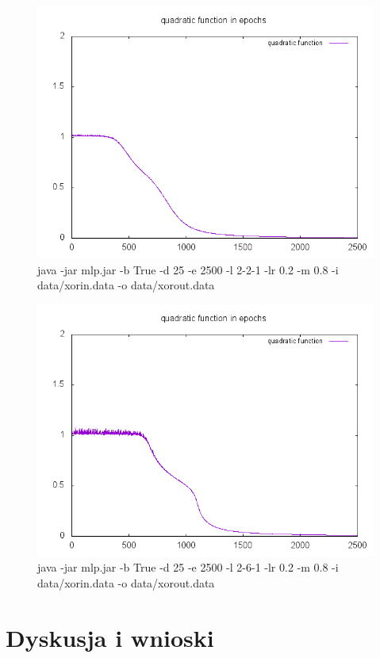 \documentclass{classrep}
\begin{document}
{\newpage
\begin{figure}[h!]
 \centering
 \includegraphics[width=12cm]{img/xor221biastrue.png}
 \vspace{-0.3cm}
 \caption{java -jar mlp.jar -b True -d 25 -e 2500 -l 2-2-1 -lr 0.2 -m 0.8 -i data/xorin.data -o data/xorout.data}
\end{figure}

\begin{figure}[h!]
 \centering
 \includegraphics[width=12cm]{img/xor261.png}
 \vspace{-0.3cm}
 \caption{java -jar mlp.jar -b True -d 25 -e 2500 -l 2-6-1 -lr 0.2 -m 0.8 -i data/xorin.data -o data/xorout.data}
\end{figure}

\section{Dyskusja i wnioski}
{
}}
\end{document}
